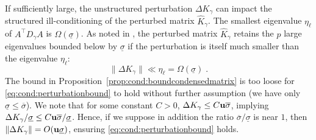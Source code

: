 If sufficiently large, the unstructured perturbation $\Delta K_\gamma$
can impact the structured ill-conditioning of the perturbed matrix $\widehat{K}_\gamma$.
The smallest eigenvalue $\eta_\ell$ of $A^\top D_\gamma A$ is $\Omega(\underline{\sigma})$. As noted in
\cite[Section 3.4.2]{wright1998ill}, the perturbed matrix $\widehat{K}_\gamma$ retains the $p$ large eigenvalues
bounded below by $\underline{\sigma}$ if the perturbation is itself much smaller than the eigenvalue $\eta_\ell$:
\begin{equation}
  \label{eq:cond:perturbationbound}
  \| \Delta K_\gamma \| \ll \eta_\ell = \Omega(\underline{\sigma})  \; .
\end{equation}
The bound in Proposition~\ref{prop:cond:boundcondensedmatrix} is too loose
for \eqref{eq:cond:perturbationbound} to hold without further assumption
(we have only $\underline{\sigma} \leq \overline{\sigma}$).
We note that for some constant $C > 0$, $\Delta K_\gamma \leq C \mathbf{u} \overline{\sigma}$,
implying $\Delta K_\gamma / \underline{\sigma} \leq C \mathbf{u} \overline{\sigma} / \underline{\sigma}$.
Hence, if we suppose in addition the ratio $\overline{\sigma}/\underline{\sigma}$ is near $1$, then
$\| \Delta K_\gamma\|= O(\mathbf{u} \underline{\sigma})$, ensuring \eqref{eq:cond:perturbationbound} holds.

